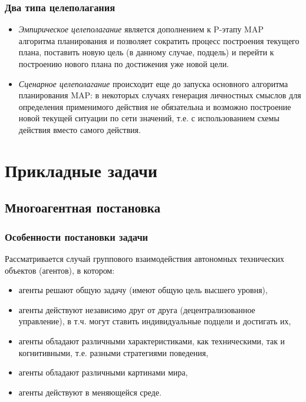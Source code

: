 \documentclass[default]{beamer}
\begin{document}
	\begin{frame}
		\frametitle{Два типа целеполагания}
		
		\begin{itemize}
			\item \textit{Эмпирическое целеполагание} является дополнением к P-этапу MAP алгоритма планирования и позволяет сократить процесс построения текущего плана, поставить новую цель (в данному случае, подцель) и перейти к построению нового плана по достижения уже новой цели.
			\item \textit{Сценарное целеполагание} происходит еще до запуска основного алгоритма планирования MAP: в некоторых случаях генерация личностных смыслов для определения применимого действия не обязательна и возможно построение новой текущей ситуации по сети значений, т.е. с использованием схемы действия вместо самого действия.
		\end{itemize}
		
	\end{frame}

	\section{Прикладные задачи}
	\subsection{Многоагентная постановка}
	\begin{frame}
		\frametitle{Особенности постановки задачи}
		
		Рассматривается случай группового взаимодействия автономных технических объектов (агентов), в котором:
		\begin{itemize}
			\item агенты решают общую задачу (имеют общую цель высшего уровня),
			\item агенты действуют независимо друг от друга (децентрализованное управление), в т.ч. могут ставить индивидуальные подцели и достигать их,
			\item агенты обладают различными характеристиками, как техническими, так и когнитивными, т.е. разными стратегиями поведения,
			\item агенты обладают различными картинами мира,
			\item агенты действуют в меняющейся среде.
		\end{itemize}
		
	\end{frame}
	
\end{document}
